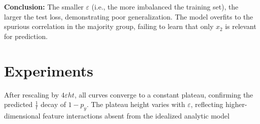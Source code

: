 \documentclass[11pt]{article}
\begin{document}
\textbf{Conclusion:} The smaller $\varepsilon$ (i.e., the more imbalanced the training set), the larger the test loss, demonstrating poor generalization. The model overfits to the spurious correlation in the majority group, failing to learn that only $x_2$ is relevant for prediction.

\section*{Experiments}
After rescaling by $4 \varepsilon h t$, all curves converge to a constant plateau, confirming the predicted $\frac{1}{t}$ decay of $1- p_y$. The plateau height varies with $\varepsilon$, reflecting higher-dimensional feature interactions absent from the idealized analytic model
\end{document}
